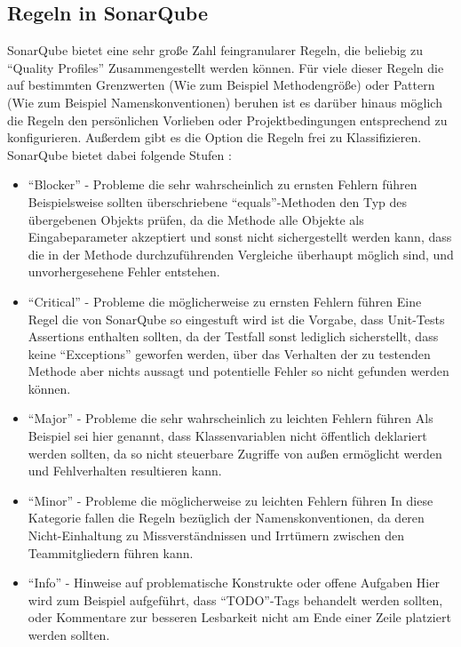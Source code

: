 \documentclass[da,ngerman]{stthesis}
\begin{document}
			\subsection{Regeln in SonarQube}
			SonarQube bietet eine sehr große Zahl feingranularer Regeln, die beliebig zu "`Quality Profiles"' Zusammengestellt werden können. Für viele dieser Regeln die auf bestimmten Grenzwerten (Wie zum Beispiel Methodengröße) oder Pattern (Wie zum Beispiel Namenskonventionen) beruhen ist es darüber hinaus möglich die Regeln den persönlichen Vorlieben oder Projektbedingungen entsprechend zu konfigurieren. Außerdem gibt es die Option die Regeln frei zu Klassifizieren. \newline
			SonarQube bietet dabei folgende Stufen \cite{SonarRuleSeverities}: 
			\begin{itemize}
				\item "`Blocker"' - Probleme die sehr wahrscheinlich zu ernsten Fehlern führen \newline
				Beispielsweise sollten überschriebene "`equals"'-Methoden den Typ des übergebenen Objekts prüfen, da die Methode alle Objekte als Eingabeparameter akzeptiert und sonst nicht sichergestellt werden kann, dass die in der Methode durchzuführenden Vergleiche überhaupt möglich sind, und unvorhergesehene Fehler entstehen.
				\item "`Critical"' - Probleme die möglicherweise zu ernsten Fehlern führen \newline
				Eine Regel die von SonarQube so eingestuft wird ist die Vorgabe, dass Unit-Tests Assertions enthalten sollten, da der Testfall sonst lediglich sicherstellt, dass keine "`Exceptions"' geworfen werden, über das Verhalten der zu testenden Methode aber nichts aussagt und potentielle Fehler so nicht gefunden werden können. 
				\item "`Major"' - Probleme die sehr wahrscheinlich zu leichten Fehlern führen \newline
				Als Beispiel sei hier genannt, dass Klassenvariablen nicht öffentlich deklariert werden sollten, da so nicht steuerbare Zugriffe von außen ermöglicht werden und Fehlverhalten resultieren kann.
				\item "`Minor"' - Probleme die möglicherweise zu leichten Fehlern führen \newline
				In diese Kategorie fallen die Regeln bezüglich der Namenskonventionen, da deren Nicht-Einhaltung zu Missverständnissen und Irrtümern zwischen den Teammitgliedern führen kann.
				\item "`Info"' - Hinweise auf problematische Konstrukte oder offene Aufgaben \newline
				Hier wird zum Beispiel aufgeführt, dass "`TODO"'-Tags behandelt werden sollten, oder Kommentare zur besseren Lesbarkeit nicht am Ende einer Zeile platziert werden sollten.
			\end{itemize}
\end{document}
